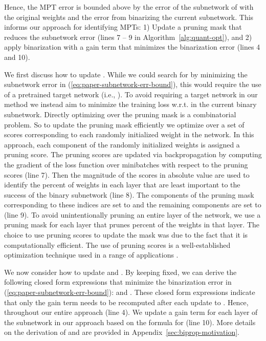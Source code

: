 \documentclass{article} \usepackage{iclr2021_conference,times}
\begin{document}
\normalsize
\noindent Hence, the MPT error is bounded above by the error of the subnetwork of  with the original weights and the error from binarizing the current subnetwork. This informs our approach for identifying MPTs: 1) Update a pruning mask  that reduces the subnetwork error (lines 7 -- 9 in Algorithm~\ref{alg:quant-opt}), and 2) apply binarization with a gain term that minimizes the binarization error (lines 4 and 10).

We first discuss how to update . 
While we could search for  by minimizing the subnetwork error in (\ref{eq:paper-subnetwork-err-bound}), this would require the use of a pretrained target network (i.e., ). To avoid requiring a target network in our method we instead aim to minimize the training loss w.r.t.  in the current binary subnetwork.
Directly optimizing over the pruning mask is a combinatorial problem. So to update the pruning mask efficiently we optimize over a set of scores  corresponding to each randomly initialized weight in the network. In this approach, each component of the randomly initialized weights is assigned a pruning score. The pruning scores are updated via backpropagation by computing the gradient of the loss function over minibatches with respect to the pruning scores (line 7). Then the magnitude of the scores in absolute value are used to identify the  percent of weights in each layer that are least important to the success of the binary subnetwork (line 8). The components of the pruning mask corresponding to these indices are set to  and the remaining components are set to  (line 9). To avoid unintentionally pruning an entire layer of the network, we use a pruning mask for each layer that prunes  percent of the weights in that layer. The choice to use pruning scores to update the mask  was due to the fact that it is computationally efficient. The use of pruning scores is a well-established optimization technique used in a range of applications \citep{boyd2009sensor,ramanujan2019whats}.



We now consider how to update  and . By keeping  fixed, we can derive the following closed form expressions that minimize the binarization error in (\ref{eq:paper-subnetwork-err-bound}):
 and . These closed form expressions indicate that only the gain term needs to be recomputed after each update to . Hence,  throughout our entire approach (line 4). We update a gain term for each layer of the subnetwork in our approach based on the formula for  (line 10). More details on the derivation of  and  are provided in Appendix~\ref{sec:biprop-motivation}. 
\end{document}
